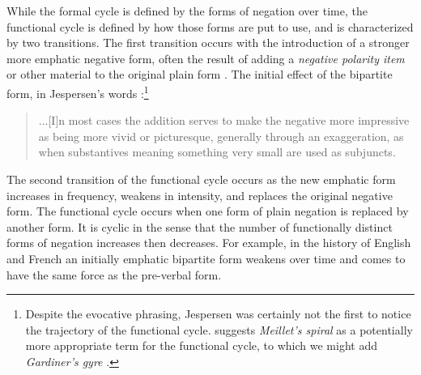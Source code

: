 \documentclass[linguex]{sp}
\theoremstyle{definition} \newtheorem{definition}{Definition}
\begin{document}
While the formal cycle is defined by the forms of negation over time, the functional cycle is defined by how those forms are put to use, and is characterized by two transitions.  The first transition occurs with the introduction of a stronger more emphatic negative form, often the result of adding a \emph{negative polarity item} or other material to the original plain form \citep{horn:1989, vanGelderen2008negative, givon1978, croft1991}. The initial effect of the bipartite form, in Jespersen's words \citeyearpar[15]{jespersen:1917}:\footnote{Despite the evocative phrasing, Jespersen was certainly not the first to notice the trajectory of the functional cycle. \cite{vanderAuwera2009} suggests \emph{Meillet's spiral} \citeyearpar[394]{meillet1912} as a potentially more appropriate term for the functional cycle, to which we might add \emph{Gardiner's gyre} \citeyearpar[134]{gardiner1904}.
}


\begin{quotation}
...[I]n most cases the addition serves to make the negative more impressive as being more vivid or picturesque, generally through an exaggeration, as when substantives meaning something very small are used as subjuncts.
\end{quotation}

The second transition of the functional cycle occurs as the new emphatic form increases in frequency, weakens in intensity, and replaces the original negative form. The functional cycle occurs when one form of plain negation is replaced by another form. It is cyclic in the sense that the number of functionally distinct forms of negation increases then decreases. For example, in the history of English and French an initially emphatic bipartite form weakens over time and comes to have the same force as the pre-verbal form.
\end{document}
